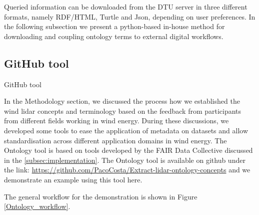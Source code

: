 \documentclass[remotesensing,article,submit,pdftex,moreauthors]{Definitions/mdpi}
\begin{document}
Queried information can be downloaded from the DTU server in three different formats, namely RDF/HTML, Turtle and Json, depending on user preferences. In the following subsection we present a python-based in-house method for downloading and coupling ontology terms to external digital workflows. 

    




\subsection{GitHub tool}
\label{GitTool}
GitHub tool

In the Methodology section, we discussed the process how we established the wind lidar concepts and terminology based on the feedback from participants from different fields working in wind energy. During these discussions, we developed some tools to ease the application of metadata on datasets and allow standardisation across different application domains in wind energy. The Ontology tool is based on tools developed by the FAIR Data Collective discussed in the \ref{subsec:implementation}. The Ontology tool is available on github under the link: \href{https://github.com/PacoCosta/Extract-lidar-ontology-concepts}{https://github.com/PacoCosta/Extract-lidar-ontology-concepts} and we demonstrate an example using this tool here.

The general workflow for the demonstration is shown in Figure \ref{Ontology_workflow}.
\end{document}
